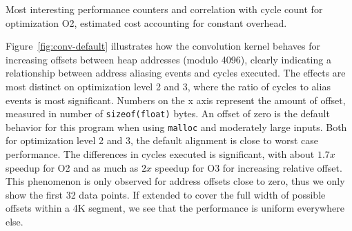 \documentclass[prodmode,acmtaco]{acmsmall}
\newcommand{\perfctr}[1] {
  {\lowercase{#1}}
}
\begin{document}
{%
\begin{table*}[t]
  \centering
  \caption{Most interesting performance counters and correlation with cycle count for optimization O2, estimated cost accounting for constant overhead.}
  \label{tab:convstats}
  \renewcommand{\tabcolsep}{4pt} %
  \pgfplotstabletypeset[
    font=\footnotesize,
    int detect, %
    col sep=comma,
    columns={Performance counter, Correlation, 0, 2, 4, 8},
    column type=r,
    columns/Performance counter/.style={
      string type, 
      column type=l,
      postproc cell content/.append code={
        \pgfkeysalso{@cell content=\perfctr{##1}}
      }
    },
    columns/Correlation/.style={
      fixed,
      fixed zerofill,
      precision=2
    },
    every head row/.style={
      output empty row,
      before row={\toprule
        Performance counter & $r$ & 0 & 2 & 4 & 8 \\
        },
      after row=\midrule,
    },
    every last row/.style={after row=\bottomrule}
  ]{bin/conv-default-o2.estimate.csv}
\end{table*}

Figure~\ref{fig:conv-default} illustrates how the convolution kernel behaves for increasing offsets between heap addresses (modulo 4096), clearly indicating a relationship between address aliasing events and cycles executed.
The effects are most distinct on optimization level 2 and 3, where the ratio of cycles to alias events is most significant.
Numbers on the x axis represent the amount of offset, measured in number of \texttt{sizeof(float)} bytes.
An offset of zero is the default behavior for this program when using \texttt{malloc} and moderately large inputs.
Both for optimization level 2 and 3, the default alignment is close to worst case performance.
The differences in cycles executed is significant, with about $1.7x$ speedup for O2 and as much as $2x$ speedup for O3 for increasing relative offset.
This phenomenon is only observed for address offsets close to zero, thus we only show the first 32 data points.
If extended to cover the full width of possible offsets within a 4K segment, we see that the performance is uniform everywhere else.

}
\end{document}
